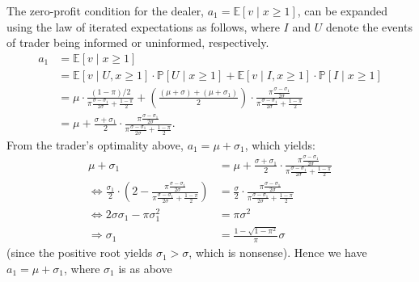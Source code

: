 \documentclass[a4paper]{article}
\begin{document}
\begin{enumerate}
	The zero-profit condition for the dealer, $a_1 = \mathbb{E} [ v \mid x \geq 1]$, can be expanded using the law of iterated expectations as follows, where $I$ and $U$ denote the events of trader being informed or uninformed, respectively.
	\begin{align*}
		a_1 &= \mathbb{E} [ v \mid x \geq 1]
		\\
		&= \mathbb{E} [ v \mid U, x \geq 1] \cdot \mathbb{P} [ U \mid x \geq 1 ] + \mathbb{E} [ v \mid I, x \geq 1] \cdot \mathbb{P} [ I \mid x \geq 1 ]
		\\
		&= \mu \cdot \frac{(1-\pi)/2}{\pi \frac{\sigma - \sigma_1}{2 \sigma} + \frac{1-\pi}{2}} + \left( \frac{(\mu + \sigma) + (\mu + \sigma_1)}{2} \right) \cdot \frac{\pi \frac{\sigma - \sigma_1}{2 \sigma}}{\pi \frac{\sigma - \sigma_1}{2 \sigma} + \frac{1-\pi}{2}}
		\\
		&= \mu + \frac{\sigma + \sigma_1}{2} \cdot \frac{\pi \frac{\sigma - \sigma_1}{2 \sigma}}{\pi \frac{\sigma - \sigma_1}{2 \sigma} + \frac{1-\pi}{2}}.
	\end{align*}
	From the trader's optimality above, $a_1 = \mu + \sigma_1$, which yields:
	\begin{align*}
		\mu + \sigma_1 &= \mu + \frac{\sigma + \sigma_1}{2} \cdot \frac{\pi \frac{\sigma - \sigma_1}{2 \sigma}}{\pi \frac{\sigma - \sigma_1}{2 \sigma} + \frac{1-\pi}{2}}
		\\
		\Leftrightarrow
		\frac{\sigma_1}{2} \cdot \left( 2 - \frac{\pi \frac{\sigma - \sigma_1}{2 \sigma}}{\pi \frac{\sigma - \sigma_1}{2 \sigma} + \frac{1-\pi}{2}} \right)
		&= \frac{\sigma}{2} \cdot \frac{\pi \frac{\sigma - \sigma_1}{2 \sigma}}{\pi \frac{\sigma - \sigma_1}{2 \sigma} + \frac{1-\pi}{2}}
		\\
		\Leftrightarrow
		2\sigma \sigma_1 - \pi \sigma_1^2 &= \pi \sigma^2
		\\
		\Rightarrow
		\sigma_1 &= \frac{1 - \sqrt{1 - \pi^2}}{\pi} \sigma
	\end{align*}
	(since the positive root yields $\sigma_1 > \sigma$, which is nonsense).
	Hence we have $a_1 = \mu + \sigma_1$, where $\sigma_1$ is as above
	

\end{enumerate}
\end{document}
